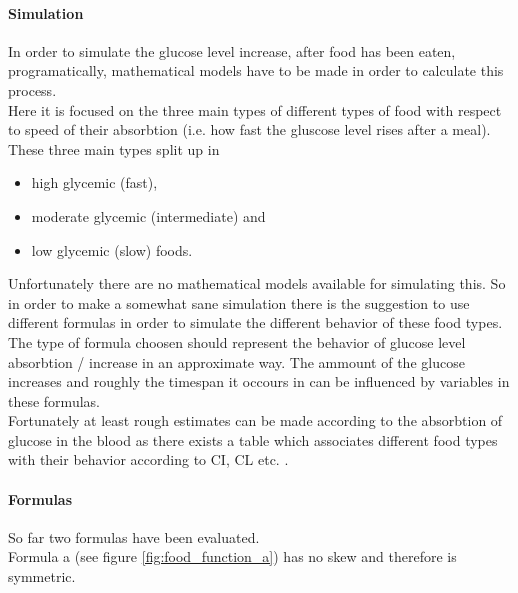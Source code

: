 \documentclass[pdflatex,a4paper,11pt,english]{scrreprt}
\begin{document}
\paragraph{Simulation} 
In order to simulate the glucose level increase, after food has been eaten, programatically, mathematical models have to be made in order to calculate this process. \\
Here it is focused on the three main types of different types of food with respect to speed of their absorbtion (i.e. how fast the gluscose level rises after a meal). \\
These three main types split up in

\begin{itemize}
  \item high glycemic (fast),
  \item moderate glycemic (intermediate) and
  \item low glycemic (slow) foods.
\end{itemize}

Unfortunately there are no mathematical models available for simulating this.
So in order to make a somewhat sane simulation there is the suggestion to use different formulas in order to simulate the different behavior of these food types. The type of formula choosen should represent the behavior of glucose level absorbtion / increase in an approximate way. The ammount of the glucose increases and roughly the timespan it occours in can be influenced by variables in these formulas. \\
Fortunately at least rough estimates can be made according to the absorbtion of
glucose in the blood as there exists a table which associates different food types
with their behavior according to CI, CL etc. \cite{glycemicindex:table}.

\newpage

\paragraph{Formulas} 
So far two formulas have been evaluated. \\
Formula a (see figure \vref{fig:food_function_a}) has no skew and therefore is
symmetric. 
\end{document}
